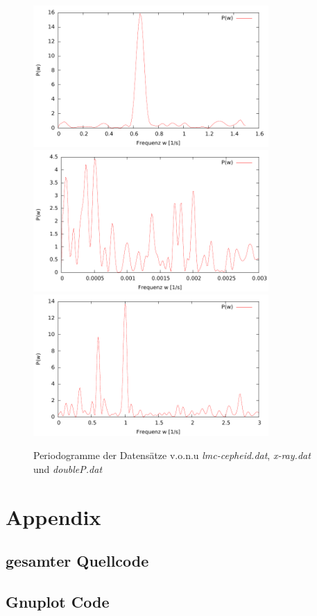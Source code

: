 \documentclass{scrartcl}
\begin{document}
\begin{figure}[htp!]
\begin{center}
		\includegraphics[width=0.8\textwidth]{plot-lmc-cepheid.pdf}
		\includegraphics[width=0.8\textwidth]{plot-x-ray.pdf}
		\includegraphics[width=0.8\textwidth]{plot-doubleP.pdf}
	\caption{Periodogramme der Datensätze v.o.n.u \textit{lmc-cepheid.dat}, \textit{x-ray.dat} und \textit{doubleP.dat}}
	\label{pic:periodo}
\end{center}
\end{figure}
\newpage
\section{Appendix}
\subsection{gesamter Quellcode}

\subsection{Gnuplot Code}

\end{document}
